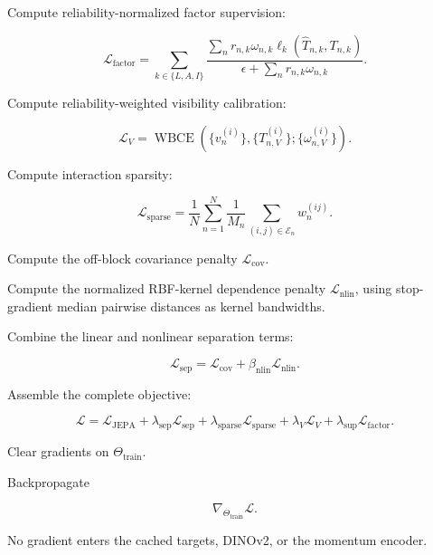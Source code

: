 \begin{tcolorbox}
\begin{algsteps}
\item
Compute reliability-normalized factor supervision:

\[
\mathcal L_{\mathrm{factor}}
=
\sum_{k\in\{L,A,I\}}
\frac{
\sum_n
r_{n,k}\omega_{n,k}
\ell_k
\left(
\widehat T_{n,k},T_{n,k}
\right)
}{
\epsilon+
\sum_n
r_{n,k}\omega_{n,k}
}.
\]

\item
Compute reliability-weighted visibility calibration:

\[
\mathcal L_V
=
\operatorname{WBCE}
\left(
\{v_n^{(i)}\},
\{T_{n,V}^{(i)}\};
\{\omega_{n,V}^{(i)}\}
\right).
\]

\item
Compute interaction sparsity:

\[
\mathcal L_{\mathrm{sparse}}
=
\frac{1}{N}
\sum_{n=1}^{N}
\frac{1}{M_n}
\sum_{(i,j)\in\mathcal E_n}
w_n^{(ij)}.
\]

\item
Compute the off-block covariance penalty
\(\mathcal L_{\mathrm{cov}}\).

\item
Compute the normalized RBF-kernel dependence penalty
\(\mathcal L_{\mathrm{nlin}}\), using stop-gradient median pairwise
distances as kernel bandwidths.

\item
Combine the linear and nonlinear separation terms:

\[
\mathcal L_{\mathrm{sep}}
=
\mathcal L_{\mathrm{cov}}
+
\beta_{\mathrm{nlin}}
\mathcal L_{\mathrm{nlin}}.
\]

\item
Assemble the complete objective:

\[
\mathcal L
=
\mathcal L_{\mathrm{JEPA}}
+
\lambda_{\mathrm{sep}}\mathcal L_{\mathrm{sep}}
+
\lambda_{\mathrm{sparse}}\mathcal L_{\mathrm{sparse}}
+
\lambda_V\mathcal L_V
+
\lambda_{\mathrm{sup}}\mathcal L_{\mathrm{factor}}.
\]


\item
Clear gradients on \(\Theta_{\mathrm{train}}\).

\item
Backpropagate

\[
\nabla_{\Theta_{\mathrm{train}}}\mathcal L.
\]

No gradient enters the cached targets, DINOv2, or the momentum encoder.


\end{algsteps}
\end{tcolorbox}
